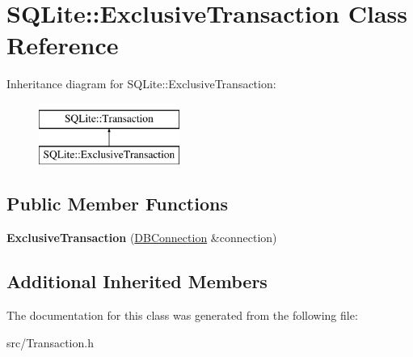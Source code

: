 \hypertarget{class_s_q_lite_1_1_exclusive_transaction}{\section{S\-Q\-Lite\-:\-:Exclusive\-Transaction Class Reference}
\label{class_s_q_lite_1_1_exclusive_transaction}
}
Inheritance diagram for S\-Q\-Lite\-:\-:Exclusive\-Transaction\-:\begin{figure}[H]
\begin{center}
\leavevmode
\includegraphics[height=2.000000cm]{class_s_q_lite_1_1_exclusive_transaction}
\end{center}
\end{figure}
\subsection*{Public Member Functions}
\begin{DoxyCompactItemize}
\item 
\hypertarget{class_s_q_lite_1_1_exclusive_transaction_a70f16f1e9764fd35b0c7e9fbf7314a1f}{{\bfseries Exclusive\-Transaction} (\hyperlink{class_s_q_lite_1_1_d_b_connection}{D\-B\-Connection} \&connection)}\label{class_s_q_lite_1_1_exclusive_transaction_a70f16f1e9764fd35b0c7e9fbf7314a1f}

\end{DoxyCompactItemize}
\subsection*{Additional Inherited Members}


The documentation for this class was generated from the following file\-:\begin{DoxyCompactItemize}
\item 
src/Transaction.\-h\end{DoxyCompactItemize}

